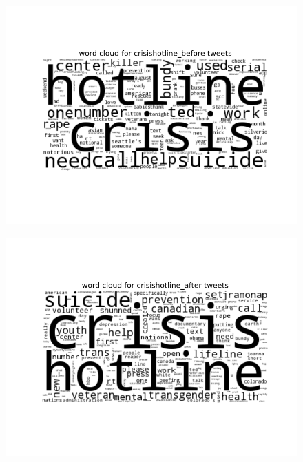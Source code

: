 \documentclass[11pt, oneside]{article}   	%
\begin{document}
 \begin{figure}
 \includegraphics[width=\textwidth]{../figures/crisishotline_before.png}
 \centering
 \end{figure}

 \begin{figure}
 \includegraphics[width=\textwidth]{../figures/crisishotline_after.png}
 \centering
 \end{figure}
\end{document}
